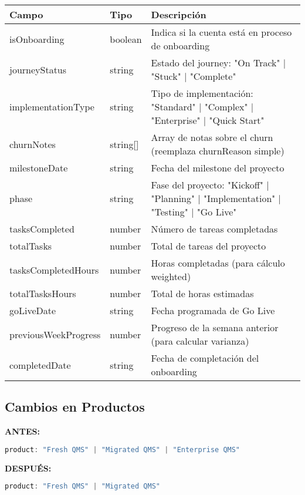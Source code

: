 \documentclass[12pt,a4paper]{article}
\begin{document}
\begin{longtable}{|p{4cm}|p{3cm}|p{7cm}|}
\hline
\textbf{Campo} & \textbf{Tipo} & \textbf{Descripción} \\
\hline
\endhead
isOnboarding & boolean & Indica si la cuenta está en proceso de onboarding \\
\hline
journeyStatus & string & Estado del journey: "On Track" | "Stuck" | "Complete" \\
\hline
implementationType & string & Tipo de implementación: "Standard" | "Complex" | "Enterprise" | "Quick Start" \\
\hline
churnNotes & string[] & Array de notas sobre el churn (reemplaza churnReason simple) \\
\hline
milestoneDate & string & Fecha del milestone del proyecto \\
\hline
phase & string & Fase del proyecto: "Kickoff" | "Planning" | "Implementation" | "Testing" | "Go Live" \\
\hline
tasksCompleted & number & Número de tareas completadas \\
\hline
totalTasks & number & Total de tareas del proyecto \\
\hline
tasksCompletedHours & number & Horas completadas (para cálculo weighted) \\
\hline
totalTasksHours & number & Total de horas estimadas \\
\hline
goLiveDate & string & Fecha programada de Go Live \\
\hline
previousWeekProgress & number & Progreso de la semana anterior (para calcular varianza) \\
\hline
completedDate & string & Fecha de completación del onboarding \\
\hline
\end{longtable}

\subsection{Cambios en Productos}

\textbf{ANTES:}
\begin{lstlisting}[language=JavaScript]
product: "Fresh QMS" | "Migrated QMS" | "Enterprise QMS"
\end{lstlisting}

\textbf{DESPUÉS:}
\begin{lstlisting}[language=JavaScript]
product: "Fresh QMS" | "Migrated QMS"
\end{lstlisting}
\end{document}
